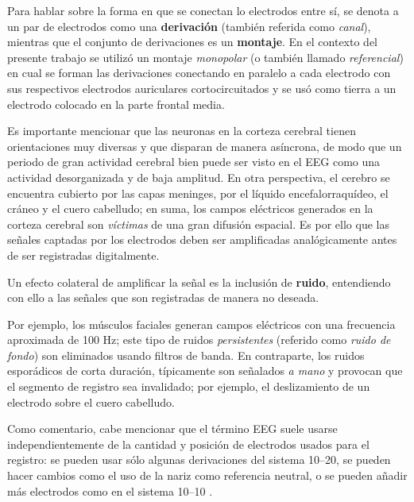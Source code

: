 \documentclass[12pt,letterpaper]{book}
\newcommand{\hz}{\si{\hertz}\xspace}
\begin{document}
Para hablar sobre la forma en que se conectan lo electrodos entre sí, se denota a un par de electrodos como una \textbf{derivación} (también referida como \textit{canal}), mientras que el conjunto de derivaciones es un \textbf{montaje}.
%
En el contexto del presente trabajo se utilizó un montaje \textit{monopolar} (o también llamado \textit{referencial}) en cual se forman las derivaciones conectando en paralelo a cada electrodo con sus respectivos electrodos auriculares cortocircuitados y se usó como tierra a un electrodo colocado en la parte frontal media.

Es importante mencionar que las neuronas en la corteza cerebral tienen orientaciones muy diversas y que disparan de manera asíncrona, de modo que un periodo de gran actividad cerebral bien puede ser visto en el EEG como una actividad desorganizada y de baja amplitud.
%
En otra perspectiva, el cerebro se encuentra cubierto por las capas meninges, por el líquido encefalorraquídeo, el cráneo y el cuero cabelludo; en suma, los campos eléctricos generados en la corteza cerebral son \textit{víctimas} de una gran difusión espacial.
%
Es por ello que las señales captadas por los electrodos deben ser amplificadas analógicamente antes de ser registradas digitalmente.

Un efecto colateral de amplificar la señal es la inclusión de \textbf{ruido}, entendiendo con ello a las señales que son registradas de manera no deseada.

Por ejemplo, los músculos faciales generan campos eléctricos con una frecuencia aproximada de 100 \hz; este tipo de ruidos \textit{persistentes} (referido como \textit{ruido de fondo}) son eliminados usando filtros de banda.
%
En contraparte, los ruidos esporádicos de corta duración, típicamente son señalados \textit{a mano} y provocan que el segmento de registro sea invalidado; por ejemplo, el deslizamiento de un electrodo sobre el cuero cabelludo.


Como comentario, cabe mencionar que el
%
término EEG suele usarse independientemente de la cantidad y posición de electrodos usados para el registro: se pueden usar sólo algunas derivaciones del sistema 10--20, se pueden hacer cambios como el uso de la nariz como referencia neutral, o se pueden añadir más electrodos como en el sistema 10--10 \cite{Klem99}. 
\end{document}
